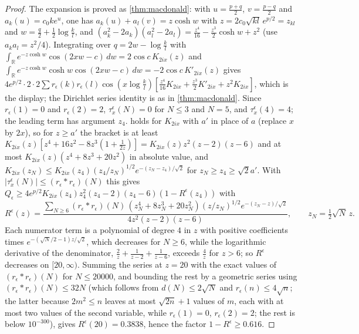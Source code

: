 \documentclass[11pt]{article}
\theoremstyle{definition}\newtheorem{definition}[theorem]{Definition}
\theoremstyle{remark}\newtheorem{remark}[theorem]{Remark}
\newcommand{\R}{\mathbb R}\newcommand{\C}{\mathbb C}\newcommand{\N}{\mathbb N}
\begin{document}
\begin{proof}
The expansion is proved as \cref{thm:macdonald}: with $u=\frac{p+q}2$, $v=\frac{p-q}2$ and $a_k(u)=c_0ke^u$, one has $a_k(u)+a_l(v)=z\cosh w$ with $z=2c_0\sqrt{kl}\,e^{p/2}=z_{kl}$ and $w=\frac q2+\frac12\log\frac kl$, and $(a_k^2-2a_k)(a_l^2-2a_l)=\frac{z^4}{16}-\frac{z^3}2\cosh w+z^2$ (use $a_ka_l=z^2/4$). Integrating over $q=2w-\log\frac kl$ with $\int_\R e^{-z\cosh w}\cos(2xw-c)\,dw=2\cos c\,K_{2ix}(z)$ and $\int_\R e^{-z\cosh w}\cosh w\cos(2xw-c)\,dw=-2\cos c\,K'_{2ix}(z)$ gives $4e^{p/2}\cdot2\cdot2\sum r_\epsilon(k)r_\epsilon(l)\cos(x\log\frac kl)[\frac{z^4}{16}K_{2ix}+\frac{z^3}2K'_{2ix}+z^2K_{2ix}]$, which is the display; the Dirichlet series identity is as in \cref{thm:macdonald}. Since $r_\epsilon(1)=0$ and $r_\epsilon(2)=2$, $\tau^\epsilon_x(N)=0$ for $N\le3$ and $N=5$, and $\tau^\epsilon_x(4)=4$; the leading term has argument $z_4$.  holds for $K_{2ix}$ with $a'$ in place of $a$ (replace $x$ by $2x$), so for $z\ge a'$ the bracket is at least $K_{2ix}(z)[z^4+16z^2-8z^3(1+\frac1{2z})]=K_{2ix}(z)z^2(z-2)(z-6)$ and at most $K_{2ix}(z)(z^4+8z^3+20z^2)$ in absolute value, and $K_{2ix}(z_N)\le K_{2ix}(z_4)(z_4/z_N)^{1/2}e^{-(z_N-z_4)/\sqrt2}$ for $z_N\ge z_4\ge\sqrt2a'$. With $|\tau^\epsilon_x(N)|\le(r_\epsilon*r_\epsilon)(N)$ this gives $Q_\epsilon\ge4e^{p/2}K_{2ix}(z_4)z_4^2(z_4-2)(z_4-6)(1-R^\epsilon(z_4))$ with
\[
R^\epsilon(z)=\frac{\sum_{N\ge6}(r_\epsilon*r_\epsilon)(N)\,(z_N^4+8z_N^3+20z_N^2)(z/z_N)^{1/2}e^{-(z_N-z)/\sqrt2}}{4z^2(z-2)(z-6)},\qquad z_N=\tfrac12\sqrt N\,z .
\]
Each numerator term is a polynomial of degree $4$ in $z$ with positive coefficients times $e^{-(\sqrt N/2-1)z/\sqrt2}$, which decreases for $N\ge6$, while the logarithmic derivative of the denominator, $\frac2z+\frac1{z-2}+\frac1{z-6}$, exceeds $\frac4z$ for $z>6$; so $R^\epsilon$ decreases on $[20,\infty)$. Summing the series at $z=20$ with the exact values of $(r_\epsilon*r_\epsilon)(N)$ for $N\le20000$, and bounding the rest by a geometric series using $(r_\epsilon*r_\epsilon)(N)\le32N$ (which follows from $d(N)\le2\sqrt N$ and $r_\epsilon(n)\le4\sqrt n$; the latter because $2m^2\le n$ leaves at most $\sqrt{2n}+1$ values of $m$, each with at most two values of the second variable, while $r_\epsilon(1)=0$, $r_\epsilon(2)=2$; the rest is below $10^{-300}$), gives $R^\epsilon(20)=0.3838$, hence the factor $1-R^\epsilon\ge0.616$.
\end{proof}
\end{document}
